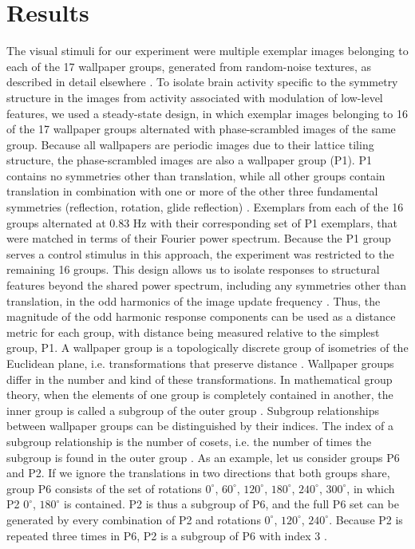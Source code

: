 \documentclass[9pt,twocolumn,twoside,lineno]{pnas-new}
\begin{document}
\section*{Results}

The visual stimuli for our experiment were multiple exemplar images belonging to each of the 17 wallpaper groups, generated from random-noise textures, as described in detail elsewhere \cite{RN1725}. To isolate brain activity specific to the symmetry structure in the images from activity associated with modulation of low-level features, we used a steady-state design, in which exemplar images belonging to 16 of the 17 wallpaper groups alternated with phase-scrambled images of the same group. Because all wallpapers are periodic images due to their lattice tiling structure, the phase-scrambled images are also a wallpaper group (P1). P1 contains no symmetries other than translation, while all other groups contain translation in combination with one or more of the other three fundamental symmetries (reflection, rotation, glide reflection) \cite{RN1425}. 
Exemplars from each of the 16 groups alternated at 0.83 Hz with their corresponding set of P1 exemplars, that were matched in terms of their Fourier power spectrum. Because the P1 group serves a control stimulus in this approach, the experiment was restricted to the remaining 16 groups. This design allows us to isolate responses to structural features beyond the shared power spectrum, including any symmetries other than translation, in the odd harmonics of the image update frequency \cite{RN1725,RN1540, RN1954}. Thus, the magnitude of the odd harmonic response components can be used as a distance metric for each group, with distance being measured relative to the simplest group, P1. A wallpaper group is a topologically discrete group of isometries of the Euclidean plane, i.e. transformations that preserve distance \cite{RN1425}. Wallpaper groups differ in the number and kind of these transformations. In mathematical group theory, when the elements of one group is completely contained in another, the inner group is called a subgroup of the outer group \cite{RN1425}. Subgroup relationships between wallpaper groups can be distinguished by their indices. The index of a subgroup relationship is the number of cosets, i.e. the number of times the subgroup is found in the outer group \cite{RN1425}. As an example, let us consider groups P6 and P2. If we ignore the translations in two directions that both groups share, group P6 consists of the set of rotations {$0^{\circ}$, $60^{\circ}$, $120^{\circ}$, $180^{\circ}$, $240^{\circ}$, $300^{\circ}$}, in which P2 {$0^{\circ}$, $180^{\circ}$} is contained. P2 is thus a subgroup of P6, and the full P6 set can be generated by every combination of P2 and rotations {$0^{\circ}$, $120^{\circ}$, $240^{\circ}$}. Because P2 is repeated three times in P6, P2 is a subgroup of P6 with index 3 \cite{RN1425}.
\end{document}
